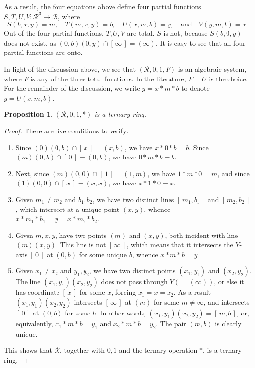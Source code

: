 \documentclass[12pt]{article}
\newtheorem{prop}{Proposition}
\begin{document}
As a result, the four equations above define four partial functions $S,T,U,V: \mathcal{R}^3 \to \mathcal{R}$, where $$S(b,x,y)=m,\quad T(m,x,y)=b,\quad U(x,m,b)=y,\quad\mbox{and}\quad V(y,m,b)=x.$$
Out of the four partial functions, $T,U,V$ are total.  $S$ is not, because $S(b,0,y)$ does not exist, as $(0,b)(0,y)\cap [\,\infty\,]=(\infty)$.  It is easy to see that all four partial functions are onto.

In light of the discussion above, we see that $(\mathcal{R},0,1,F)$ is an algebraic system, where $F$ is any of the three total functions.  In the literature, $F=U$ is the choice.  For the remainder of the discussion, we write $y=x*m*b$ to denote $y=U(x,m,b)$.

\begin{prop} $(\mathcal{R},0,1,*)$ is a ternary ring. \end{prop}
\begin{proof}  There are five conditions to verify:
\begin{enumerate}
\item Since $(0)(0,b)\cap [\,x\,]=(x,b)$, we have $x*0*b=b$.  Since $(m)(0,b)\cap [\,0\,]=(0,b)$, we have $0*m*b=b$.  
\item Next, since $(m)(0,0)\cap [\,1\,]=(1,m)$, we have $1*m*0=m$, and since $(1)(0,0)\cap [\,x\,]=(x,x)$, we have $x*1*0=x$.  
\item Given $m_1\ne m_2$ and $b_1,b_2$, we have two distinct lines $[\,m_1,b_1\,]$ and $[\,m_2,b_2\,]$, which intersect at a unique point $(x,y)$, whence $x*m_1*b_1=y=x*m_2*b_2$.
\item Given $m,x,y$, have two points $(m)$ and $(x,y)$, both incident with line $(m)(x,y)$.  This line is not $[\,\infty\,]$, which means that it intersects the $Y$-axis $[\,0\,]$ at $(0,b)$ for some unique $b$, whence $x*m*b=y$.
\item Given $x_1\ne x_2$ and $y_1,y_2$, we have two distinct points $(x_1,y_1)$ and $(x_2,y_2)$.  The line $(x_1,y_1)(x_2,y_2)$ does not pass through $Y(=(\infty))$, or else it has coordinate $[\,x\,]$ for some $x$, forcing $x_1=x=x_2$.  As a result $(x_1,y_1)(x_2,y_2)$ intersects $[\,\infty\,]$ at $(m)$ for some $m\ne \infty$, and intersects $[\,0\,]$ at $(0,b)$ for some $b$.  In other words, $(x_1,y_1)(x_2,y_2)=[\,m,b\,]$, or, equivalently, $x_1*m*b=y_1$ and $x_2*m*b=y_2$.  The pair $(m,b)$ is clearly unique.
\end{enumerate}
This shows that $\mathcal{R}$, together with $0,1$ and the ternary operation $*$, is a ternary ring.
\end{proof}
\end{document}
